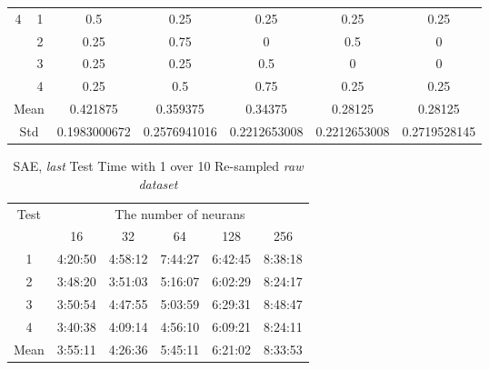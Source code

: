 \documentclass[draft,dvipsnames]{drexel-thesis}
\begin{document}
\begin{thesis}
\begin{table}[!t]
\begin{tabular}{|c|c|c|c|c|c|c|}
\multirow{4}{*}{4}    & 1                   & 0.5          & 0.25         & 0.25         & 0.25         & 0.25         \\ \cline{2-7} 
                      & 2                   & 0.25         & 0.75         & 0            & 0.5          & 0            \\ \cline{2-7} 
                      & 3                   & 0.25         & 0.25         & 0.5          & 0            & 0            \\ \cline{2-7} 
                      & 4                   & 0.25         & 0.5          & 0.75         & 0.25         & 0.25         \\ \hline
\multicolumn{2}{|c|}{Mean}                  & 0.421875     & 0.359375     & 0.34375      & 0.28125      & 0.28125      \\ \hline
\multicolumn{2}{|c|}{Std}                   & 0.1983000672 & 0.2576941016 & 0.2212653008 & 0.2212653008 & 0.2719528145 \\ \hline
\end{tabular}
\end{table}

\begin{table}[!t]
\centering
\caption{SAE, {\em last} Test Time with 1 over 10 Re-sampled {\em raw dataset}}
\label{tbl:sae_last_1_10_time}
\begin{tabular}{|c|c|c|c|c|c|}
\hline
\multirow{2}{*}{Test} & \multicolumn{5}{c|}{The number of neurans}      \\ \cline{2-6} 
                      & 16      & 32      & 64      & 128     & 256     \\ \hline
1                     & 4:20:50 & 4:58:12 & 7:44:27 & 6:42:45 & 8:38:18 \\ \hline
2                     & 3:48:20 & 3:51:03 & 5:16:07 & 6:02:29 & 8:24:17 \\ \hline
3                     & 3:50:54 & 4:47:55 & 5:03:59 & 6:29:31 & 8:48:47 \\ \hline
4                     & 3:40:38 & 4:09:14 & 4:56:10 & 6:09:21 & 8:24:11 \\ \hline
Mean                  & 3:55:11 & 4:26:36 & 5:45:11 & 6:21:02 & 8:33:53 \\ \hline
\end{tabular}
\end{table}



\end{thesis}
\end{document}
